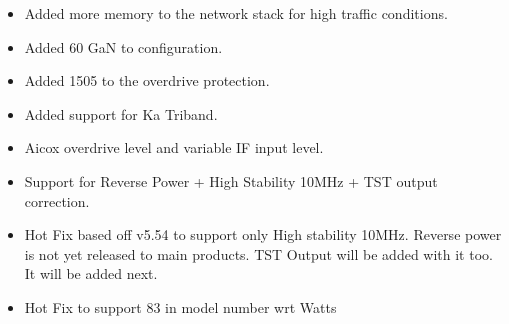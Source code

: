 \documentclass[letterpaper,10pt,english]{sphinxhowto}
\begin{document}
\begin{description}
\begin{itemize}
\end{itemize}

\begin{itemize}
\item {} 
\sphinxAtStartPar
Added more memory to the network stack for high traﬃc conditions.

\end{itemize}

\begin{itemize}
\item {} 
\sphinxAtStartPar
Added 60 GaN to conﬁguration.

\end{itemize}

\begin{itemize}
\item {} 
\sphinxAtStartPar
Added \sphinxhyphen{}1505 to the overdrive protection.

\end{itemize}

\begin{itemize}
\item {} 
\sphinxAtStartPar
Added support for Ka Triband.

\end{itemize}

\begin{itemize}
\item {} 
\sphinxAtStartPar
Aicox overdrive level and variable IF input level.

\end{itemize}

\begin{itemize}
\item {} 
\sphinxAtStartPar
Support for Reverse Power + High Stability 10MHz + TST output correction.

\end{itemize}

\begin{itemize}
\item {} 
\sphinxAtStartPar
Hot Fix based oﬀ v5.54 to support only High stability 10MHz. Reverse power is not
yet released to main products. TST Output will be added with it too. It will be added next.

\end{itemize}

\begin{itemize}
\item {} 
\sphinxAtStartPar
Hot Fix to support 83 in model number wrt Watts


\end{itemize}
\end{description}
\end{document}
